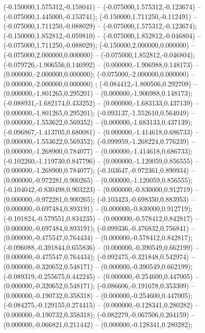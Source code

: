  (-0.150000,1.575312,-0.158041) -- (-0.075000,1.575312,-0.123674) -- (-0.075000,1.445000,-0.153741);
 (-0.150000,1.711250,-0.112491) -- (-0.075000,1.711250,-0.088029) -- (-0.075000,1.575312,-0.123674);
 (-0.150000,1.852812,-0.059810) -- (-0.075000,1.852812,-0.046804) -- (-0.075000,1.711250,-0.088029);
 (-0.150000,2.000000,0.000000) -- (-0.075000,2.000000,0.000000) -- (-0.075000,1.852812,-0.046804);
 (-0.079726,-1.906556,0.146992) -- (0.000000,-1.906988,0.148173) -- (0.000000,-2.000000,0.000000);
 (-0.075000,-2.000000,0.000000) -- (0.000000,-2.000000,0.000000) ;
 (-0.084412,-1.800506,0.292709) -- (0.000000,-1.801265,0.295201) -- (0.000000,-1.906988,0.148173);
 (-0.088931,-1.682174,0.433252) -- (0.000000,-1.683133,0.437139) -- (0.000000,-1.801265,0.295201);
 (-0.093137,-1.552610,0.564049) -- (0.000000,-1.553622,0.569352) -- (0.000000,-1.683133,0.437139);
 (-0.096867,-1.413705,0.680081) -- (0.000000,-1.414618,0.686733) -- (0.000000,-1.553622,0.569352);
 (-0.099959,-1.268224,0.776239) -- (0.000000,-1.268900,0.784077) -- (0.000000,-1.414618,0.686733);
 (-0.102260,-1.119730,0.847796) -- (0.000000,-1.120059,0.856555) -- (0.000000,-1.268900,0.784077);
 (-0.103647,-0.972361,0.890934) -- (0.000000,-0.972281,0.900265) -- (0.000000,-1.120059,0.856555);
 (-0.104042,-0.830498,0.903223) -- (0.000000,-0.830000,0.912719) -- (0.000000,-0.972281,0.900265);
 (-0.103423,-0.698350,0.883953) -- (0.000000,-0.697484,0.893191) -- (0.000000,-0.830000,0.912719);
 (-0.101824,-0.579551,0.834235) -- (0.000000,-0.578412,0.842817) -- (0.000000,-0.697484,0.893191);
 (-0.099336,-0.476832,0.756841) -- (0.000000,-0.475547,0.764434) -- (0.000000,-0.578412,0.842817);
 (-0.096088,-0.391844,0.655836) -- (0.000000,-0.390549,0.662199) -- (0.000000,-0.475547,0.764434);
 (-0.092475,-0.321848,0.542974) -- (0.000000,-0.320652,0.548171) -- (0.000000,-0.390549,0.662199);
 (-0.089319,-0.255675,0.442245) -- (0.000000,-0.254600,0.447005) -- (0.000000,-0.320652,0.548171);
 (-0.086606,-0.191678,0.353309) -- (0.000000,-0.190732,0.358318) -- (0.000000,-0.254600,0.447005);
 (-0.084275,-0.129155,0.274415) -- (0.000000,-0.128341,0.280282) -- (0.000000,-0.190732,0.358318);
 (-0.082279,-0.067506,0.204159) -- (0.000000,-0.066821,0.211442) -- (0.000000,-0.128341,0.280282);
